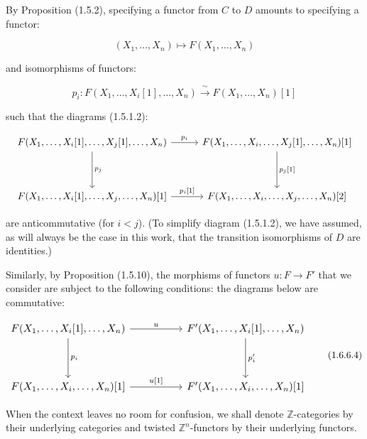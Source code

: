 %
By Proposition (1.5.2), specifying a functor from $C$ to $D$ amounts
to specifying a functor:

\begin{equation}
  (X_1,\ldots,X_n)\longmapsto F(X_1,\ldots,X_n)
  \tag{1.6.6.2}
\end{equation}

and isomorphisms of functors:

\begin{equation}
  p_i\colon
  F(X_1,\ldots,X_i[1],\ldots,X_n)
  \xrightarrow{\ \sim\ }
  F(X_1,\ldots,X_n)[1]
  \tag{1.6.6.3}
\end{equation}

such that the diagrams (1.5.1.2):

\begin{equation*}
  \resizebox{\textwidth}{!}{%
    $\begin{tikzcd}[ampersand replacement=\&,column sep=2.8em,row sep=3.8em]
      F(X_1,\ldots,X_i[1],\ldots,X_j[1],\ldots,X_n)
        \arrow[r,"{p_i}"]
        \arrow[d,"{p_j}"]
        \& F(X_1,\ldots,X_i,\ldots,X_j[1],\ldots,X_n)[1]
          \arrow[d,"{p_j[1]}"] \\
      F(X_1,\ldots,X_i[1],\ldots,X_j,\ldots,X_n)[1]
        \arrow[r,"{p_i[1]}"]
        \& F(X_1,\ldots,X_i,\ldots,X_j,\ldots,X_n)[2]
    \end{tikzcd}$%
  }
\end{equation*}

are anticommutative (for $i<j$). (To simplify diagram (1.5.1.2), we
have assumed, as will always be the case in this work, that the
transition isomorphisms of $D$ are identities.)

Similarly, by Proposition (1.5.10), the morphisms of functors
$u\colon F\longrightarrow F'$ that we consider are subject to the
following conditions: the diagrams below are commutative:

\begin{equation}
  \resizebox{0.92\textwidth}{!}{%
    $\begin{tikzcd}[ampersand replacement=\&,column sep=5.0em,row sep=3.8em]
      F(X_1,\ldots,X_i[1],\ldots,X_n)
        \arrow[r,"u"]
        \arrow[d,"{p_i}"]
        \& F'(X_1,\ldots,X_i[1],\ldots,X_n)
          \arrow[d,"{p'_i}"] \\
      F(X_1,\ldots,X_i,\ldots,X_n)[1]
        \arrow[r,"{u[1]}"]
        \& F'(X_1,\ldots,X_i,\ldots,X_n)[1]
    \end{tikzcd}$%
  }
  \tag{1.6.6.4}
\end{equation}

When the context leaves no room for confusion, we shall denote
$\mathbb Z$-categories by their underlying categories and twisted
$\mathbb Z^n$-functors by their underlying functors.
